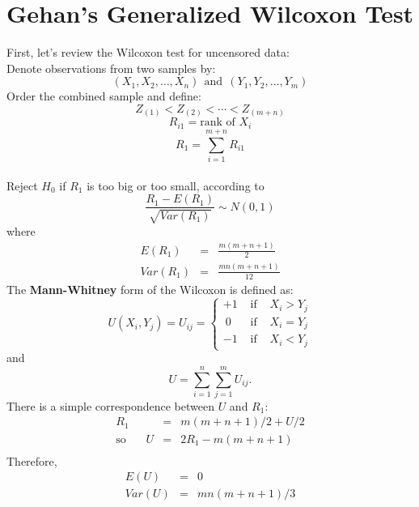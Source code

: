 \documentclass[11pt,slidesonly,semrot,portrait,palatino]{book}
\begin{document}
{\section{Gehan's Generalized Wilcoxon Test}
First, let's review the Wilcoxon test for uncensored data:\\[1ex]
Denote observations from two samples by:
$$(X_1,X_2, \ldots, X_n) ~~\mbox{and}~~ (Y_1,Y_2,\ldots,Y_m)$$
Order the combined sample and define:
\[Z_{(1)}<Z_{(2)}<\cdots<Z_{(m+n)}\]
\[R_{i1}=\mbox{rank of }X_i\]
\[R_1=\sum_{i=1}^{m+n} R_{i1}\]
\\[2ex]
Reject $H_0$ if $R_1$ is too big or too small, according to
\[\frac{R_1-E(R_1)}{\sqrt{Var(R_1)}}\sim N(0,1)\]
where
\begin{eqnarray*}
E(R_1) & = & \frac{m(m+n+1)}{2}\\[1ex]
Var(R_1) & = & \frac{mn(m+n+1)}{12}
\end{eqnarray*}
The {\bf Mann-Whitney} form of the Wilcoxon is defined as:\\[0.5ex]
\[U(X_i,Y_j)=U_{ij}=\left\{\begin{array}{ccc}
+1 & \mbox{ if } & X_i>Y_j\\
~0 & \mbox{ if } & X_i=Y_j\\
-1 & \mbox{ if } & X_i<Y_j
\end{array} \right.\]
and
\[U=\sum_{i=1}^n \sum_{j=1}^m U_{ij}.\]
There is a simple correspondence between $U$ and $R_1$:
\begin{eqnarray*}
R_1 & = & m(m+n+1)/2+U/2\\[2ex]
\mbox{so}~~~~~~~~ U & = & 2 R_1 - m(m+n+1)\\[3ex]
\end{eqnarray*}
Therefore,
\begin{eqnarray*}
E(U) & = & 0\\[2ex]
Var(U) & = & mn(m+n+1)/3
\end{eqnarray*}
}
\end{document}

